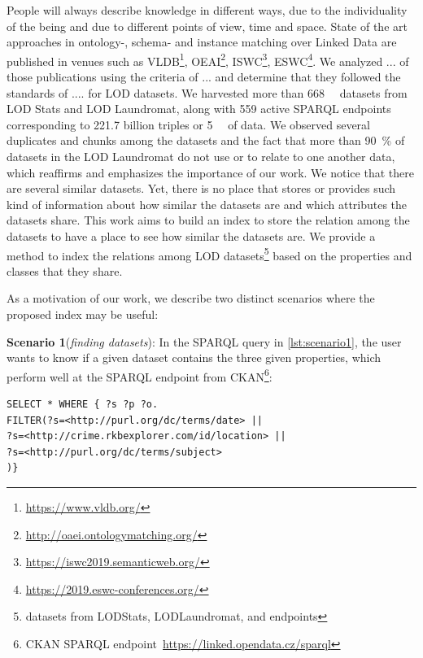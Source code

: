 \documentclass[sw]{iosart2x}
\begin{document}
People will always describe knowledge in different ways, due to the individuality of the being and due to different points of view, time and space.
State of the art approaches in ontology-, schema- and instance matching over Linked Data are published in venues such as VLDB\footnote{\url{https://www.vldb.org/}}, OEAI\footnote{\url{http://oaei.ontologymatching.org/}}, ISWC\footnote{\url{https://iswc2019.semanticweb.org/}}, ESWC\footnote{\url{https://2019.eswc-conferences.org/}}.
We analyzed ... of those publications using the criteria of ... and determine that they followed the standards of .... for LOD datasets. 
We harvested more than \SI{668}{\kilo\nothing} datasets from LOD Stats and LOD Laundromat, along with 559 active SPARQL endpoints corresponding to \num{221.7} billion triples or \SI{5}{\tebi\byte} of data.
We observed several duplicates and chunks among the datasets and the fact that more than \SI{90}{\percent} of datasets in the LOD Laundromat do not use  or \footnotemark{} to relate to one another data, which reaffirms and emphasizes the importance of our work.
We notice that there are several similar datasets.
Yet, there is no place that stores or provides such kind of information about how similar the datasets are and which attributes the datasets share.
This work aims to build an index to store the relation among the datasets to have a place to see how similar the datasets are.
We provide a method to index the relations among LOD datasets\footnote{datasets from LODStats, LODLaundromat, and endpoints} based on the properties and classes that they share.

As a motivation of our work, we describe two distinct scenarios where the proposed index may be useful:

\textbf{Scenario 1}(\emph{finding datasets}): In the SPARQL query in \cref{lst:scenario1}, the user wants to know if a given dataset contains the three given properties, which perform well at the SPARQL endpoint from CKAN\footnote{CKAN SPARQL endpoint~\url{https://linked.opendata.cz/sparql}}:
\begin{lstlisting}[language=SPARQL, label={lst:scenario1}, caption=Scenario 1.]
SELECT * WHERE { ?s ?p ?o.
FILTER(?s=<http://purl.org/dc/terms/date> || 
?s=<http://crime.rkbexplorer.com/id/location> || 
?s=<http://purl.org/dc/terms/subject>
)}
\end{lstlisting}
\end{document}

